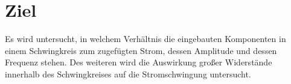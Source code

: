\section{Ziel}
\label{sec:Ziel}

Es wird untersucht, in welchem Verhältnis die eingebauten Komponenten in einem Schwingkreis zum zugefügten Strom, dessen Amplitude und dessen Frequenz stehen.
Des weiteren wird die Auswirkung großer Widerstände innerhalb des Schwingkreises auf die Stromschwingung untersucht.